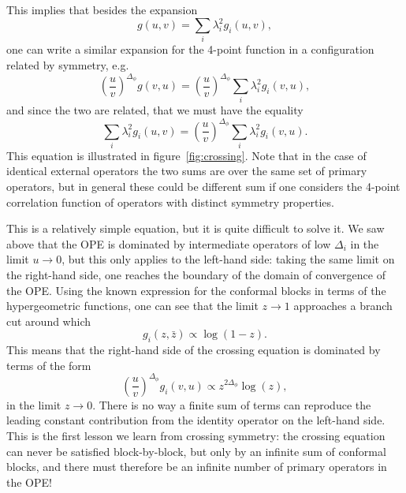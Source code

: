\documentclass[a4paper,12pt]{article}
\numberwithin{equation}{section}
\begin{document}
This implies that besides the expansion
\begin{equation}
	g(u,v) = \sum_i \lambda_i^2 g_i(u,v),
\end{equation}
one can write a similar expansion for the 4-point function in a configuration related by symmetry, e.g.
\begin{equation}
	\left( \frac{u}{v} \right)^{\Delta_\phi} g(v, u)
	= \left( \frac{u}{v} \right)^{\Delta_\phi} 
	\sum_i \lambda_i^2 g_i(v,u),
\end{equation}
and since the two are related, that we must have the equality
\begin{equation}
	\sum_i \lambda_i^2 g_i(u,v)
	= \left( \frac{u}{v} \right)^{\Delta_\phi} 
	\sum_i \lambda_i^2 g_i(v, u).
\end{equation}
This equation is illustrated in figure~\ref{fig:crossing}. Note that in the case of identical external operators the two sums are over the same set of primary operators, but in general these could be different sum if one considers the 4-point correlation function of operators with distinct symmetry properties.

This is a relatively simple equation, but it is quite difficult to solve it. We saw above that the OPE is dominated by intermediate operators of low $\Delta_i$ in the limit $u \to 0$, but this only applies to the left-hand side: taking the same limit on the right-hand side, one reaches the boundary of the domain of convergence of the OPE.
Using the known expression for the conformal blocks in terms of the hypergeometric functions, one can see that the limit $z \to 1$ approaches a branch cut around which
\begin{equation}
	g_i(z, \bar{z}) \propto \log(1 - z).
\end{equation}
This means that the right-hand side of the crossing equation is dominated by terms of the form
\begin{equation}
	\left( \frac{u}{v} \right)^{\Delta_\phi} 
	g_i(v, u) \propto
	z^{2\Delta_\phi} \log(z),
\end{equation}
in the limit $z \to 0$.
There is no way a finite sum of terms can reproduce the leading constant contribution from the identity operator on the left-hand side.
This is the first lesson we learn from crossing symmetry:
the crossing equation can never be satisfied block-by-block, but only by an infinite sum of conformal blocks, and there must therefore be an infinite number of primary operators in the OPE!
\end{document}
